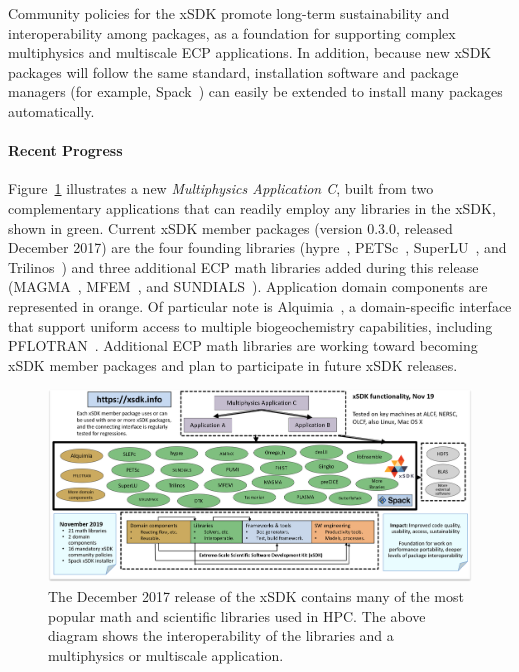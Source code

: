 Community policies for the xSDK promote long-term sustainability and interoperability among packages, as a foundation for supporting complex multiphysics and multiscale ECP applications. In addition, because new xSDK packages will follow the same standard, installation software and package managers (for example, Spack~\cite{gamblin+:sc15}) can easily be extended to install many packages automatically.


\paragraph{Recent Progress}

Figure~\ref{fig:xsdk-schematic} illustrates a new {\em Multiphysics
	Application C}, built from two complementary applications that can
readily employ any libraries in the xSDK, shown in green.  Current xSDK member packages (version 0.3.0, released December 2017) are the four founding libraries
(hypre~\cite{hypre:homepage}, PETSc~\cite{petsc:homepage}, SuperLU~\cite{superlu:homepage}, and Trilinos~\cite{trilinos:homepage}) 
and three additional ECP math libraries added during this release (MAGMA~\cite{magma:homepage}, MFEM~\cite{mfem:homepage}, and SUNDIALS~\cite{sundials:homepage}).  
Application domain components are represented
in orange.  Of particular note is Alquimia~\cite{alquimia:homepage}, a domain-specific interface
that support uniform access to multiple biogeochemistry capabilities, including
PFLOTRAN~\cite{pflotran:homepage}.  Additional ECP math libraries are working toward becoming xSDK member packages and plan to participate in future xSDK releases.
\begin{figure}[htb]
	\centering
	\includegraphics[width=6in]{projects/2.3.3-MathLibs/2.3.3.01-xSDK/xSDK-diagram}
	\caption{\label{fig:xsdk-schematic}The December 2017 release of the xSDK contains many of the most popular math and scientific libraries used in HPC.  The above diagram shows the interoperability of the libraries and a multiphysics or multiscale application.}
\end{figure}

